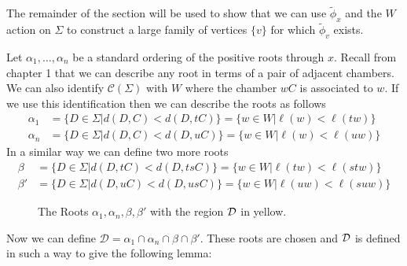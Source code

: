 \documentclass[class=book, crop=false,12 pt]{standalone}
\begin{document}
The remainder of the section will be used to show that we can use $\tilde{\phi}_x$ and the $W$ action on $\Sigma$ to construct a large family of vertices $\{v\}$ for which $\tilde{\phi}_v$ exists.

Let $\alpha_1,\dots,\alpha_n$ be a standard ordering of the positive roots through $x.$ Recall from chapter 1 that we can describe any root in terms of a pair of adjacent chambers. We can also identify $\mathcal{C}(\Sigma)$ with $W$ where the chamber $wC$ is associated to $w.$ If we use this identification then we can describe the roots as follows
\begin{align*}
	\alpha_1&=\{D\in \Sigma|d(D,C)<d(D,tC)\}=\{w\in W|\ell(w)<\ell(tw)\}\\
	\alpha_n&=\{D\in \Sigma|d(D,C)<d(D,uC)\}=\{w\in W|\ell(w)<\ell(uw)\}
\end{align*}
In a similar way we can define two more roots
\begin{align*}
	\beta&=\{D\in \Sigma|d(D,tC)<d(D,tsC)\}=\{w\in W|\ell(tw)<\ell(stw)\}\\
	\beta'&=\{D\in \Sigma|d(D,uC)<d(D,usC)\}=\{w\in W|\ell(uw)<\ell(suw)\}
\end{align*}
\begin{figure}[h]
	\label{fig:defineD}
	\begin{center}
	\caption{The Roots $\alpha_1,\alpha_n,\beta,\beta'$ with the region $\mathcal{D}$ in yellow.}
\end{center}
\end{figure}

Now we can define $\mathcal{D}=\alpha_1\cap \alpha_n \cap \beta\cap \beta'.$ These roots are chosen and $\mathcal{D}$ is defined in such a way to give the following lemma:
\end{document}
